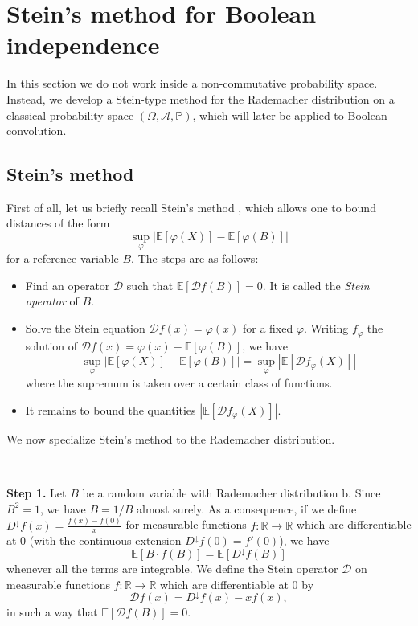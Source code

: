 \documentclass[10pt, reqno]{amsart}
\numberwithin{equation}{section}
\theoremstyle{definition}
\theoremstyle{plain}
\theoremstyle{remark}
\newcommand{\1}{\mathbbm{1}}
\begin{document}
\section{Stein's method for Boolean independence}
In this section we do not work inside a non-commutative probability space.
Instead, we develop a Stein-type method for the Rademacher distribution on a classical probability space $(\Omega, \mathcal{A},\mathbb{P})$, which will later be applied to Boolean convolution.
\subsection{Stein's method}\label{sec:Steinmethod}
First of all, let us briefly recall Stein’s method \cite{chen2010normal,goldschmidt2000chen,ross2011fundamentals}, which allows one to bound distances of the form
$$\sup_{\varphi}|\mathbb{E}[\varphi(X)]-\mathbb{E}[\varphi(B)]|$$
for a reference variable $B$. The steps are as follows:
\begin{itemize}\item Find an operator $\mathcal{D}$ such that $\mathbb{E}[\mathcal{D}f(B)]=0$. It is called the \textit{Stein operator} of $B$.
\item Solve the Stein equation
$\mathcal{D}f(x)= \varphi(x)$
for a fixed $\varphi$. Writing $f_\varphi$ the solution of $\mathcal{D}f(x)= \varphi(x)-\mathbb{E}[\varphi(B)]$, we have $$\sup_{\varphi}|\mathbb{E}[\varphi(X)]-\mathbb{E}[\varphi(B)]|=\sup_{\varphi}|\mathbb{E}[\mathcal{D}f_\varphi(X)]|$$
where the supremum is taken over a certain class of functions.
\item It remains to bound the quantities
$|\mathbb{E}[\mathcal{D}f_\varphi(X)]|$.
\end{itemize}
We now specialize Stein’s method to the Rademacher distribution.



$ $

\noindent \textbf{Step 1.}
Let $B$ be a random variable  with Rademacher distribution $\mathbb{\mathrm{b}}$. 
Since $B^2=1$, we have $B=1/B$ almost surely. As a consequence, if we define $D^\downarrow f(x)=\frac{f(x)-f(0)}{x}$ for measurable functions $f:\mathbb{R}\to \mathbb{R}$ which are differentiable at $0$ (with the continuous extension $D^\downarrow f(0)=f'(0)$),
we have
$$\mathbb{E}[B\cdot f(B)]=\mathbb{E}[D^\downarrow f(B)]$$ whenever all the terms are integrable.
We define the Stein operator $\mathcal{D}$ on measurable functions $f:\mathbb{R}\to \mathbb{R}$ which are differentiable at $0$ by
$$\mathcal{D}f(x)=D^\downarrow f(x)-xf(x),$$
in such a way that $\mathbb{E}[\mathcal{D}f(B)]=0$.
\end{document}
